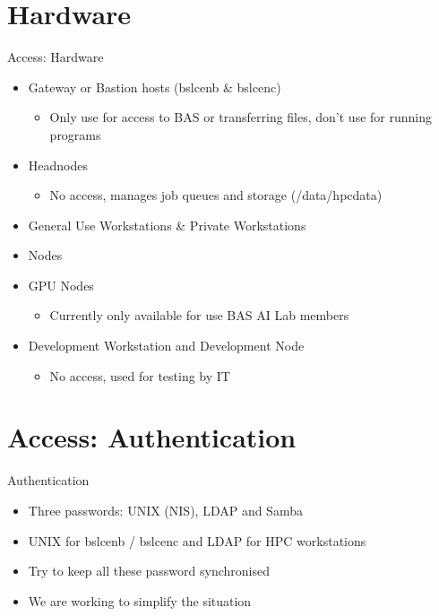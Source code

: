 {
\section{Hardware}
%
\begin{frame}{Access: Hardware}
\begin{itemize}
\item Gateway or Bastion hosts (bslcenb \& bslcenc)
\begin{itemize}
\item Only use for access to BAS or transferring files, don’t use for running programs
\end{itemize}
\item Headnodes
	\begin{itemize}
	\item No access, manages job queues and storage (/data/hpcdata)
	\end{itemize}
\item General Use Workstations & Private Workstations
\item Nodes
\item GPU Nodes
	\begin{itemize}
	\item Currently only available for use BAS AI Lab members
	\end{itemize}	
\item Development Workstation and Development Node
	\begin{itemize}
	\item  No access, used for testing by IT
	\end{itemize}
\end{itemize}
\end{frame}
}

{
\section{Access: Authentication}
%
\begin{frame}{Authentication}
\begin{itemize}
\item Three passwords: UNIX (NIS), LDAP and Samba
\item UNIX for bslcenb / bslcenc and LDAP for HPC workstations
\item Try to keep all these password synchronised
\item We are working to simplify the situation
\end{itemize}
\end{frame}
}

